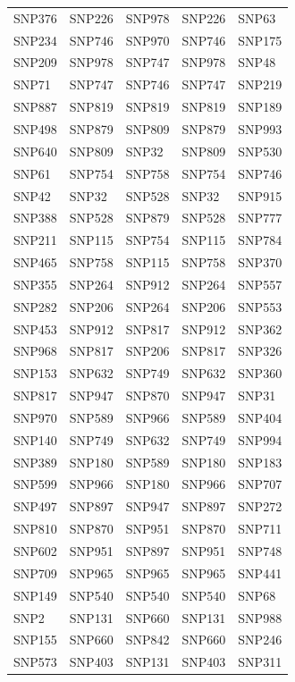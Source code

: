 \begin{table}[ht]
\begin{tabular}{lllll}
  SNP376 & SNP226 & SNP978 & SNP226 & SNP63 \\ 
  SNP234 & SNP746 & SNP970 & SNP746 & SNP175 \\ 
  SNP209 & SNP978 & SNP747 & SNP978 & SNP48 \\ 
  SNP71 & SNP747 & SNP746 & SNP747 & SNP219 \\ 
  SNP887 & SNP819 & SNP819 & SNP819 & SNP189 \\ 
  SNP498 & SNP879 & SNP809 & SNP879 & SNP993 \\ 
  SNP640 & SNP809 & SNP32 & SNP809 & SNP530 \\ 
  SNP61 & SNP754 & SNP758 & SNP754 & SNP746 \\ 
  SNP42 & SNP32 & SNP528 & SNP32 & SNP915 \\ 
  SNP388 & SNP528 & SNP879 & SNP528 & SNP777 \\ 
  SNP211 & SNP115 & SNP754 & SNP115 & SNP784 \\ 
  SNP465 & SNP758 & SNP115 & SNP758 & SNP370 \\ 
  SNP355 & SNP264 & SNP912 & SNP264 & SNP557 \\ 
  SNP282 & SNP206 & SNP264 & SNP206 & SNP553 \\ 
  SNP453 & SNP912 & SNP817 & SNP912 & SNP362 \\ 
  SNP968 & SNP817 & SNP206 & SNP817 & SNP326 \\ 
  SNP153 & SNP632 & SNP749 & SNP632 & SNP360 \\ 
  SNP817 & SNP947 & SNP870 & SNP947 & SNP31 \\ 
  SNP970 & SNP589 & SNP966 & SNP589 & SNP404 \\ 
  SNP140 & SNP749 & SNP632 & SNP749 & SNP994 \\ 
  SNP389 & SNP180 & SNP589 & SNP180 & SNP183 \\ 
  SNP599 & SNP966 & SNP180 & SNP966 & SNP707 \\ 
  SNP497 & SNP897 & SNP947 & SNP897 & SNP272 \\ 
  SNP810 & SNP870 & SNP951 & SNP870 & SNP711 \\ 
  SNP602 & SNP951 & SNP897 & SNP951 & SNP748 \\ 
  SNP709 & SNP965 & SNP965 & SNP965 & SNP441 \\ 
  SNP149 & SNP540 & SNP540 & SNP540 & SNP68 \\ 
  SNP2 & SNP131 & SNP660 & SNP131 & SNP988 \\ 
  SNP155 & SNP660 & SNP842 & SNP660 & SNP246 \\ 
  SNP573 & SNP403 & SNP131 & SNP403 & SNP311 \\ 

\end{tabular}
\end{table}
